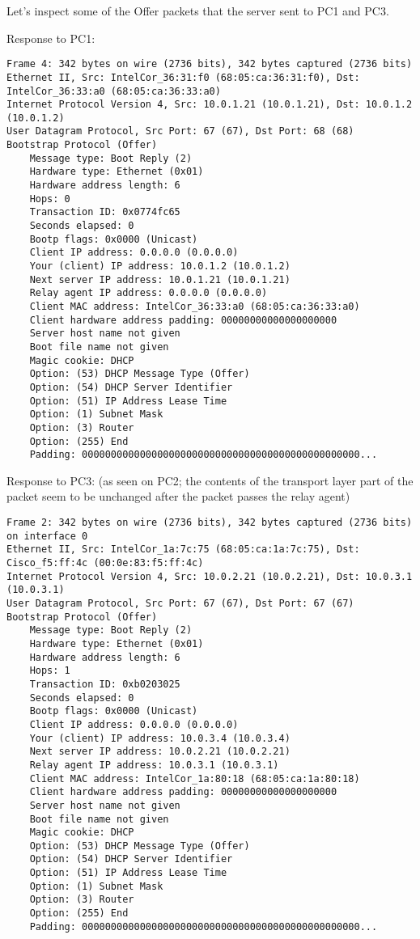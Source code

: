 Let's inspect some of the Offer packets that the server sent to PC1 and PC3.

Response to PC1:
\begin{lstlisting}
Frame 4: 342 bytes on wire (2736 bits), 342 bytes captured (2736 bits)
Ethernet II, Src: IntelCor_36:31:f0 (68:05:ca:36:31:f0), Dst: IntelCor_36:33:a0 (68:05:ca:36:33:a0)
Internet Protocol Version 4, Src: 10.0.1.21 (10.0.1.21), Dst: 10.0.1.2 (10.0.1.2)
User Datagram Protocol, Src Port: 67 (67), Dst Port: 68 (68)
Bootstrap Protocol (Offer)
    Message type: Boot Reply (2)
    Hardware type: Ethernet (0x01)
    Hardware address length: 6
    Hops: 0
    Transaction ID: 0x0774fc65
    Seconds elapsed: 0
    Bootp flags: 0x0000 (Unicast)
    Client IP address: 0.0.0.0 (0.0.0.0)
    Your (client) IP address: 10.0.1.2 (10.0.1.2)
    Next server IP address: 10.0.1.21 (10.0.1.21)
    Relay agent IP address: 0.0.0.0 (0.0.0.0)
    Client MAC address: IntelCor_36:33:a0 (68:05:ca:36:33:a0)
    Client hardware address padding: 00000000000000000000
    Server host name not given
    Boot file name not given
    Magic cookie: DHCP
    Option: (53) DHCP Message Type (Offer)
    Option: (54) DHCP Server Identifier
    Option: (51) IP Address Lease Time
    Option: (1) Subnet Mask
    Option: (3) Router
    Option: (255) End
    Padding: 000000000000000000000000000000000000000000000000...
\end{lstlisting}

Response to PC3: (as seen on PC2; the contents of the transport layer part of the packet seem to be unchanged after the packet passes the relay agent)
\begin{lstlisting}
Frame 2: 342 bytes on wire (2736 bits), 342 bytes captured (2736 bits) on interface 0
Ethernet II, Src: IntelCor_1a:7c:75 (68:05:ca:1a:7c:75), Dst: Cisco_f5:ff:4c (00:0e:83:f5:ff:4c)
Internet Protocol Version 4, Src: 10.0.2.21 (10.0.2.21), Dst: 10.0.3.1 (10.0.3.1)
User Datagram Protocol, Src Port: 67 (67), Dst Port: 67 (67)
Bootstrap Protocol (Offer)
    Message type: Boot Reply (2)
    Hardware type: Ethernet (0x01)
    Hardware address length: 6
    Hops: 1
    Transaction ID: 0xb0203025
    Seconds elapsed: 0
    Bootp flags: 0x0000 (Unicast)
    Client IP address: 0.0.0.0 (0.0.0.0)
    Your (client) IP address: 10.0.3.4 (10.0.3.4)
    Next server IP address: 10.0.2.21 (10.0.2.21)
    Relay agent IP address: 10.0.3.1 (10.0.3.1)
    Client MAC address: IntelCor_1a:80:18 (68:05:ca:1a:80:18)
    Client hardware address padding: 00000000000000000000
    Server host name not given
    Boot file name not given
    Magic cookie: DHCP
    Option: (53) DHCP Message Type (Offer)
    Option: (54) DHCP Server Identifier
    Option: (51) IP Address Lease Time
    Option: (1) Subnet Mask
    Option: (3) Router
    Option: (255) End
    Padding: 000000000000000000000000000000000000000000000000...
\end{lstlisting}

